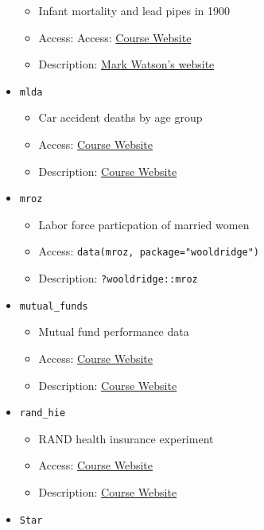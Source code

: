 \documentclass[
  letterpaper,
  DIV=11,
  numbers=noendperiod]{scrreprt}
\begin{document}
\begin{itemize}
  \begin{itemize}
  \item
    Infant mortality and lead pipes in 1900
  \item
    Access: Access:
    \href{http://bcallaway11.github.io/Courses/ECON_4750_Fall_2023/}{Course
    Website}
  \item
    Description:
    \href{http://www.princeton.edu/~mwatson/Stock-Watson_3u/Students/EE_Datasets/Lead_Mortality_Description.pdf}{Mark
    Watson's website}
  \end{itemize}
\item
  \texttt{mlda}

  \begin{itemize}
  \item
    Car accident deaths by age group
  \item
    Access:
    \href{http://bcallaway11.github.io/Courses/ECON_4750_Fall_2023/}{Course
    Website}
  \item
    Description:
    \href{http://bcallaway11.github.io/Courses/ECON_4750_Fall_2023/}{Course
    Website}
  \end{itemize}
\item
  \texttt{mroz}

  \begin{itemize}
  \item
    Labor force particpation of married women
  \item
    Access: \texttt{data(mroz,\ package="wooldridge")}
  \item
    Description: \texttt{?wooldridge::mroz}
  \end{itemize}
\item
  \texttt{mutual\_funds}

  \begin{itemize}
  \item
    Mutual fund performance data
  \item
    Access:
    \href{http://bcallaway11.github.io/Courses/ECON_4750_Fall_2023/}{Course
    Website}
  \item
    Description:
    \href{http://bcallaway11.github.io/Courses/ECON_4750_Fall_2023/}{Course
    Website}
  \end{itemize}
\item
  \texttt{rand\_hie}

  \begin{itemize}
  \item
    RAND health insurance experiment
  \item
    Access:
    \href{http://bcallaway11.github.io/Courses/ECON_4750_Fall_2023/}{Course
    Website}
  \item
    Description:
    \href{http://bcallaway11.github.io/Courses/ECON_4750_Fall_2023/}{Course
    Website}
  \end{itemize}
\item
  \texttt{Star}


\end{itemize}
\end{document}
